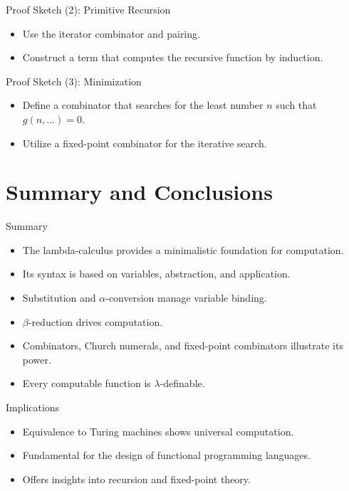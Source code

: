 \documentclass{beamer}
\begin{document}
\begin{frame}{Proof Sketch (2): Primitive Recursion}
  \begin{itemize}
    \item Use the iterator combinator and pairing.
    \item Construct a term that computes the recursive function by induction.
  \end{itemize}
\end{frame}

\begin{frame}{Proof Sketch (3): Minimization}
  \begin{itemize}
    \item Define a combinator that searches for the least number \(n\) such that \(g(n,\dots)=0\).
    \item Utilize a fixed-point combinator for the iterative search.
  \end{itemize}
\end{frame}

\section{Summary and Conclusions}
\begin{frame}{Summary}
  \begin{itemize}
    \item The lambda-calculus provides a minimalistic foundation for computation.
    \item Its syntax is based on variables, abstraction, and application.
    \item Substitution and $\alpha$-conversion manage variable binding.
    \item $\beta$-reduction drives computation.
    \item Combinators, Church numerals, and fixed-point combinators illustrate its power.
    \item Every computable function is $\lambda$-definable.
  \end{itemize}
\end{frame}

\begin{frame}{Implications}
  \begin{itemize}
    \item Equivalence to Turing machines shows universal computation.
    \item Fundamental for the design of functional programming languages.
    \item Offers insights into recursion and fixed-point theory.
  \end{itemize}
\end{frame}
\end{document}
